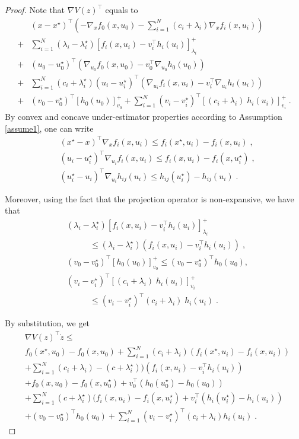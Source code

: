 \documentclass[journal,twoside,web]{ieeecolor}
\begin{document}
\begin{proof}
Note that $\nabla V(z)^\top$ equals to
\begin{align}
&(x-x^\star)^\top(-\nabla_x f_0(x,u_0)-  \sum_{i=1}^N(c_i+\lambda_i) \nabla_x f_i(x,u_i))\nonumber\\
+&\sum_{i=1}^N(\lambda_i-\lambda_{i}^\star) [f_i(x,u_i)-v_i^\top h_i(u_i)]_{\lambda_i}^+\nonumber\\
+&(u_0-u_0^\star)^\top (\nabla_{u_0} f_0(x,u_0)-v_{0}^\top \nabla_{u_0} h_{0}(u_0))\nonumber\\
+&\sum_{i=1}^N(c_i+\lambda_{i}^\star)(u_i-u_{i}^\star)^\top (\nabla_{u_i} f_i(x,u_i)-v_{i}^\top \nabla_{u_i} h_{i}(u_i))\nonumber\\
+& (v_0-v_0^\star)^\top [h_0(u_0)]_{v_0}^++ \sum_{i=1}^N (v_{i}-v_{{i}}^\star)^\top [(c_i+\lambda_i)\; h_{i}(u_i)]_{v_{i}}^+\;.
\end{align}
By convex and concave under-estimator properties according to Assumption \ref{assume1}, one can write \cite[Section~3.1.3]{boyd2004}
\begin{align}
&(x^\star-x)^\top \nabla_x f_i(x,u_i) \leq f_i(x^\star,u_i)-f_i(x,u_i)\;,\label{under_estimator_2}\\
&(u_i-u_i^\star)^\top \nabla_{u_i} f_i(x,u_i) \leq f_i(x,u_i)-f_i(x,u_i^\star)\;,\label{under_estimator_3}\\
&(u_i^\star-u_i)^\top \nabla_{u_i} h_{ij}(u_i) \leq h_{ij}(u_i^\star)-h_{ij}(u_i)\;.\label{under_estimator_4}
\end{align}

Moreover, using the fact that the projection operator is non-expansive, we have that
\begin{align}
&(\lambda_i-\lambda_{i}^\star) [f_i(x,u_i)-v_i^\top h_i(u_i)]_{\lambda_i}^+\nonumber\\
&\;\;\;\;\;\;\;\;\;\;\leq(\lambda_i-\lambda_{i}^\star) (f_i(x,u_i)-v_i^\top h_i(u_i))\;,\\
&(v_{0}-v_{{0}}^\star)^\top [ h_{0}(u_0)]_{v_{0}}^+
\leq(v_0-v_{{0}}^\star)^\top h_{0}(u_0),\\
&(v_{i}-v_{{i}}^\star)^\top [(c_i+\lambda_i)\; h_{i}(u_i)]_{v_{i}}^+\nonumber\\
&\;\;\;\;\;\;\;\;\;\;\leq(v_{i}-v_{{i}}^\star)^\top (c_i+\lambda_i)\; h_{i}(u_i)\;.
\end{align}

By substitution, we get
\begin{align}
&\nabla V(z)^\top \dot z \leq\nonumber\\ &f_0(x^\star,u_0)-f_0(x,u_0)+  \sum_{i=1}^N(c_i+\lambda_i) (f_i(x^\star,u_i)-f_i(x,u_i))\nonumber\\
&+ \sum_{i=1}^N(c_i+\lambda_i)-(c+\lambda_i^\star))(f_i(x,u_i)-v_i^\top h_i(u_i))\nonumber\\
&+f_0(x,u_0)-f_0(x,u_0^\star)+v_0^\top (h_0(u_0^\star)-h_0(u_0))\nonumber\\
&+ \sum_{i=1}^N (c+\lambda_i^\star) (f_i(x,u_i)-f_i(x,u_i^\star)+v_i^\top (h_i(u_i^\star)-h_i(u_i))\nonumber\\
&+(v_0-v_0^\star)^\top h_0(u_0)+  \sum_{i=1}^N (v_{i}-v_{i}^\star)^\top(c_i+\lambda_i) h_{i}(u_i)\;. \label{vdot_first}
\end{align}


\end{proof}
\end{document}
